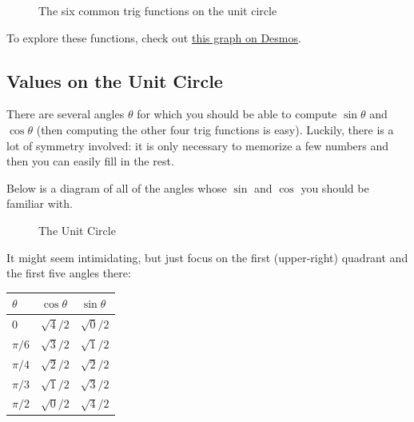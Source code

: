 \begin{figure}[h!]

\caption{The six common trig functions on the unit circle}
\label{6trig}
\end{figure}


To explore these functions, check out \href{https://www.desmos.com/calculator/fdr54f2jh3}{this graph on Desmos}.


\subsection{Values on the Unit Circle}

There are several angles $\theta$ for which you should be able to compute $\sin\theta$ and $\cos\theta$ (then computing the other four trig functions is easy). Luckily, there is a lot of symmetry involved: it is only necessary to memorize a few numbers and then you can easily fill in the rest.

Below is a diagram of all of the angles whose $\sin$ and $\cos$ you should be familiar with.

\begin{figure}[h!]
\centering

\caption{The Unit Circle}
\label{the-unit-circle}
\end{figure}


It might seem intimidating, but just focus on the first (upper-right) quadrant and the first five angles there:


\begin{center}
\renewcommand{\arraystretch}{1.3}
\begin{tabular}{@{}lll@{}}
\toprule[0.4mm]
$\theta$ & $\cos\theta$ & $\sin\theta$ \\\midrule
   $0$  & $\sqrt{4}/2$ & $\sqrt{0}/2$ \\
$\pi/6$ & $\sqrt{3}/2$ & $\sqrt{1}/2$ \\
$\pi/4$ & $\sqrt{2}/2$ & $\sqrt{2}/2$ \\
$\pi/3$ & $\sqrt{1}/2$ & $\sqrt{3}/2$ \\
$\pi/2$ & $\sqrt{0}/2$ & $\sqrt{4}/2$ \\\bottomrule[0.4mm]
\end{tabular}
\end{center}

